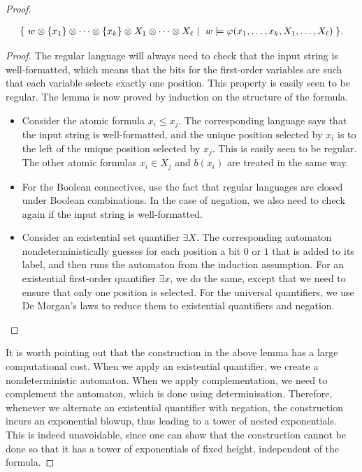 \begin{proof}
\begin{lemma}
        \begin{align*}
        \setbuild{w \otimes \set{x_1} \otimes \cdots  \otimes \set{x_k} \otimes X_1 \otimes \cdots \otimes X_\ell}{$w \models \varphi(x_1,\ldots,x_k,X_1,\ldots,X_\ell)$}.   
        \end{align*}
    \end{lemma}
    \begin{proof}
        The regular language will always need to check that the input string is well-formatted, which means that the bits for the first-order variables are such that each variable selects exactly one position. This property is easily seen to be regular. The lemma is now proved by induction on the structure of the formula.
        \begin{itemize}
            \item Consider the atomic formula $x_i \leq x_j$. The corresponding language says that the input string is well-formatted, and the unique position selected by $x_i$ is to the left of the unique position selected by $x_j$. This is easily seen to be regular. The other atomic formulas $x_i \in X_j$ and $b(x_i)$ are treated in the same way. 
            \item For the Boolean connectives, use the fact that regular languages are closed under Boolean combinations. In the case of negation, we also need to check  again if  the input string is well-formatted. 
            \item Consider an existential set quantifier $\exists X$. The corresponding automaton nondeterministically guesses for each position a bit $0$ or $1$ that is added to its label, and then runs the automaton from the induction assumption. For an existential first-order quantifier $\exists x$, we do the same, except that we need to ensure that only one position is selected. For the universal quantifiers, we use De Morgan's laws to reduce them to existential quantifiers and negation.\end{itemize} 
    \end{proof}
    It is worth pointing out that the construction in the above lemma has a large computational cost. When we apply an existential quantifier, we create a nondeterministic automaton. When we apply complementation, we need to complement the automaton, which is done using determinisation. Therefore, whenever we alternate an existential quantifier with negation, the construction incurs an exponential blowup, thus leading to a tower of nested exponentials. This is indeed unavoidable, since one can show that the construction cannot be done so that it has a tower of exponentials of fixed height, independent of the formula.
\end{proof}

